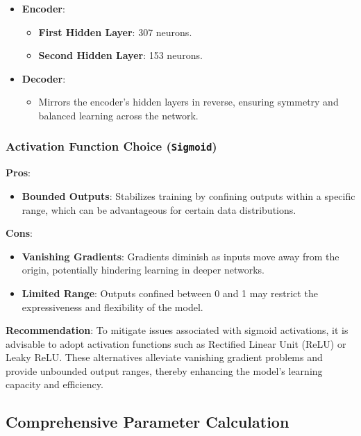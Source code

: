 \documentclass[10pt]{article}
\begin{document}
\begin{itemize}
    \item \textbf{Encoder}:
    \begin{itemize}
        \item \textbf{First Hidden Layer}: 307 neurons.
        \item \textbf{Second Hidden Layer}: 153 neurons.
    \end{itemize}
    \item \textbf{Decoder}:
    \begin{itemize}
        \item Mirrors the encoder's hidden layers in reverse, ensuring symmetry and balanced learning across the network.
    \end{itemize}
\end{itemize}

\subsubsection{Activation Function Choice (\texttt{Sigmoid})}

\textbf{Pros}:

\begin{itemize}
    \item \textbf{Bounded Outputs}: Stabilizes training by confining outputs within a specific range, which can be advantageous for certain data distributions.
\end{itemize}

\textbf{Cons}:

\begin{itemize}
    \item \textbf{Vanishing Gradients}: Gradients diminish as inputs move away from the origin, potentially hindering learning in deeper networks.
    \item \textbf{Limited Range}: Outputs confined between 0 and 1 may restrict the expressiveness and flexibility of the model.
\end{itemize}

\textbf{Recommendation}: To mitigate issues associated with sigmoid activations, it is advisable to adopt activation functions such as Rectified Linear Unit (ReLU) or Leaky ReLU. These alternatives alleviate vanishing gradient problems and provide unbounded output ranges, thereby enhancing the model's learning capacity and efficiency.

\subsection{Comprehensive Parameter Calculation}
\end{document}
